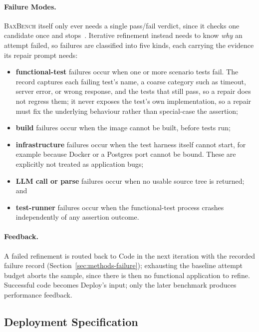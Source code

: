 \paragraph{Failure Modes.}
\textsc{BaxBench} itself only ever needs a single pass/fail verdict, since it
checks one candidate once and stops~\cite{vero2025baxbench}. Iterative
refinement instead needs to know \emph{why} an attempt failed, so failures
are classified into five kinds, each carrying the evidence its repair prompt
needs:
\begin{itemize}
  \item \textbf{functional-test} failures occur when one or more scenario
        tests fail. The record captures each failing test's name, a coarse
        category such as timeout, server error, or wrong response, and the
        tests that still pass, so a repair does not regress them; it never
        exposes the test's own implementation, so a repair must fix the
        underlying behaviour rather than special-case the assertion;
  \item \textbf{build} failures occur when the image cannot be built, before
        tests run;
  \item \textbf{infrastructure} failures occur when the test harness itself
        cannot start, for example because Docker or a Postgres port cannot be
        bound. These are explicitly not treated as application bugs;
  \item \textbf{LLM call or parse} failures occur when no usable source tree
        is returned; and
  \item \textbf{test-runner} failures occur when the functional-test process
        crashes independently of any assertion outcome.
\end{itemize}

\paragraph{Feedback.}
A failed refinement is routed back to Code in the next iteration with the
recorded failure record (Section~\ref{sec:methods-failure}); exhausting the
baseline attempt budget
aborts the sample, since there is then no functional application to refine.
Successful code becomes Deploy's input; only the later benchmark produces
performance feedback.


\subsection{Deployment Specification}
\label{sec:methods-spec}
\label{sec:methods-design}

